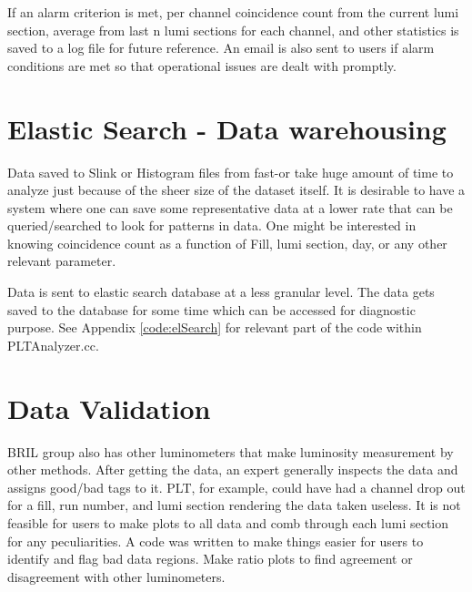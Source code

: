 If an alarm criterion is met, per channel coincidence count from the current lumi section, average from last n lumi sections for each channel, and other statistics is saved to a log file for future reference. An email is  also sent to users if alarm conditions are met so that operational issues are dealt with promptly.
        
\section{Elastic Search - Data warehousing} \label{sec:elSearch}

Data saved to Slink or Histogram files from fast-or take huge amount of time to analyze just because of the sheer size of the dataset itself. It is desirable to have a system where one can save some representative data at a lower rate that can be queried/searched to look for patterns in data. One might be interested in knowing coincidence count as a function of Fill, lumi section, day, or any other relevant parameter.


Data is sent to elastic search database at a less granular level. The data gets saved to the database for some time which can be accessed for diagnostic purpose. See Appendix \ref{code:elSearch} for relevant part of the code within PLTAnalyzer.cc.


\section{Data Validation} \label{sec:NormTags}
BRIL group also has other luminometers that make luminosity measurement by other methods. After getting the data, an expert generally inspects the data and assigns good/bad tags to it. PLT, for example, could have had a channel drop out for a fill, run number, and lumi section rendering the data taken useless. It is not feasible for users to make plots to all data and comb through each lumi section for any peculiarities. A code was written to make things easier for users to identify and flag bad data regions. Make ratio plots to find agreement or disagreement with other luminometers. 

\noindent

